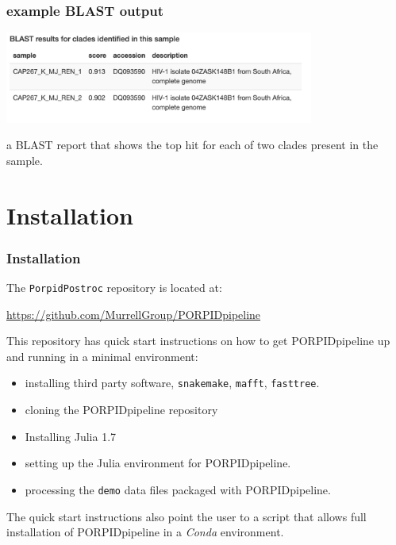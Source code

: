 \documentclass{beamer}
\begin{document}
\begin{frame}[fragile]
\frametitle{example BLAST output}

\alert<1> 



\bigskip
\begin{center}
\includegraphics[height=3cm]{images/blast.png} 
\end{center}

\bigskip
a BLAST report that shows the top hit for
each of two clades present in the sample. 

\end{frame}

\section{Installation}

\begin{frame}[fragile]
\frametitle{Installation}

\alert<1> 

The {\tt PorpidPostroc} repository is located at:

\bigskip
{\color{blue} \href{https://github.com/MurrellGroup/PORPIDpipeline}{https://github.com/MurrellGroup/PORPIDpipeline} }

\bigskip
This repository has quick start instructions on how to get PORPIDpipeline up and running
in a minimal environment:

\begin{itemize}
\item installing third party software, {\tt snakemake}, {\tt mafft}, {\tt fasttree}.
\item cloning the PORPIDpipeline repository
\item Installing Julia 1.7
\item setting up the Julia environment for PORPIDpipeline.
\item processing the {\tt demo} data files packaged with PORPIDpipeline.
\end{itemize}

The quick start instructions also point the user to a script that allows full installation
of PORPIDpipeline in a {\em Conda} environment.


\end{frame}
\end{document}
